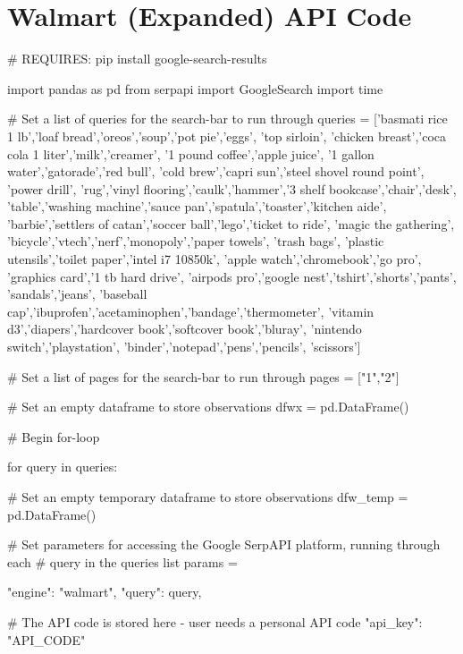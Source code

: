 \section{Walmart (Expanded) API Code}
\label{appendixC}
\begin{python}
# REQUIRES: pip install google-search-results

import pandas as pd
from serpapi import GoogleSearch
import time

# Set a list of queries for the search-bar to run through
queries = ['basmati rice 1 lb','loaf bread','oreos','soup','pot pie','eggs',
            'top sirloin', 'chicken breast','coca cola 1 liter','milk','creamer',
            '1 pound coffee','apple juice', '1 gallon water','gatorade','red bull',
            'cold brew','capri sun','steel shovel round point', 'power drill',
            'rug','vinyl flooring','caulk','hammer','3 shelf bookcase','chair','desk',
            'table','washing machine','sauce pan','spatula','toaster','kitchen aide',
            'barbie','settlers of catan','soccer ball','lego','ticket to ride',
            'magic the gathering', 'bicycle','vtech','nerf','monopoly','paper towels',
            'trash bags', 'plastic utensils','toilet paper','intel i7 10850k',
            'apple watch','chromebook','go pro', 'graphics card','1 tb hard drive',
            'airpods pro','google nest','tshirt','shorts','pants', 'sandals','jeans',
            'baseball cap','ibuprofen','acetaminophen','bandage','thermometer', 
            'vitamin d3','diapers','hardcover book','softcover book','bluray',
            'nintendo switch','playstation', 'binder','notepad','pens','pencils',
            'scissors']

# Set a list of pages for the search-bar to run through
pages = ["1","2"]

# Set an empty dataframe to store observations
dfwx = pd.DataFrame()

# Begin for-loop

for query in queries:

    # Set an empty temporary dataframe to store observations
    dfw_temp = pd.DataFrame()

    # Set parameters for accessing the Google SerpAPI platform, running through each 
    # query in the queries list
    params = {
        "engine": "walmart",
        "query": query,
                
        # The API code is stored here - user needs a personal API code
        "api_key": "API_CODE"
    }


\end{python}
